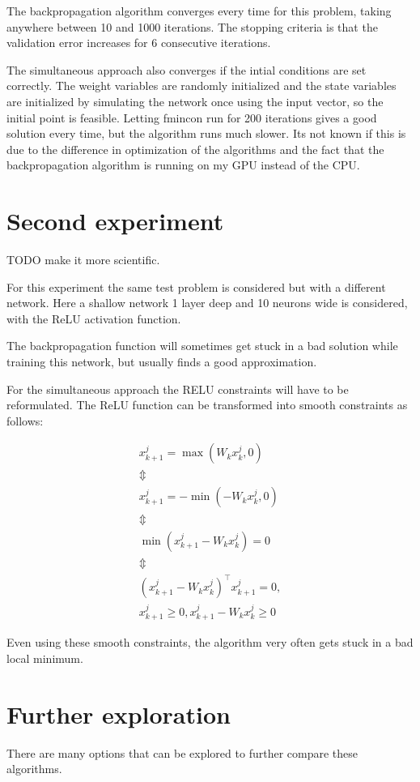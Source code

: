 The backpropagation algorithm converges every time for this problem, taking anywhere between 10 and 1000 iterations. The stopping criteria is that the validation error increases for 6 consecutive iterations.

The simultaneous approach also converges if the intial conditions are set correctly. The weight variables are randomly initialized and the state variables are initialized by simulating the network once using the input vector, so the initial point is feasible. Letting fmincon run for 200 iterations gives a good solution every time, but the algorithm runs much slower. Its not known if this is due to the difference in optimization of the algorithms and the fact that the backpropagation algorithm is running on my GPU instead of the CPU.

\section{Second experiment}
TODO make it more scientific.

For this experiment the same test problem is considered but with a different network. Here a shallow network 1 layer deep and 10 neurons wide is considered, with the ReLU activation function.

The backpropagation function will sometimes get stuck in a bad solution while training this network, but usually finds a good approximation.

For the simultaneous approach the RELU constraints will have to be reformulated. The ReLU function can be transformed into smooth constraints as follows:

   \begin{gather*}
   x_{k+1}^j = \max(W_kx_k^j,0) \\
   \Updownarrow \\
   x_{k+1}^j = -\min(-W_kx_k^j,0) \\
   \Updownarrow \\
   \min(x_{k+1}^j-W_kx_k^j) = 0 \\
   \Updownarrow \\
   (x_{k+1}^j-W_kx_k^j)^\top x_{k+1}^j = 0,\\
   x_{k+1}^j\geq 0,x_{k+1}^j-W_kx_k^j\geq 0
   \end{gather*}
   
Even using these smooth constraints, the algorithm very often gets stuck in a bad local minimum.
\section{Further exploration}
There are many options that can be explored to further compare these algorithms.

